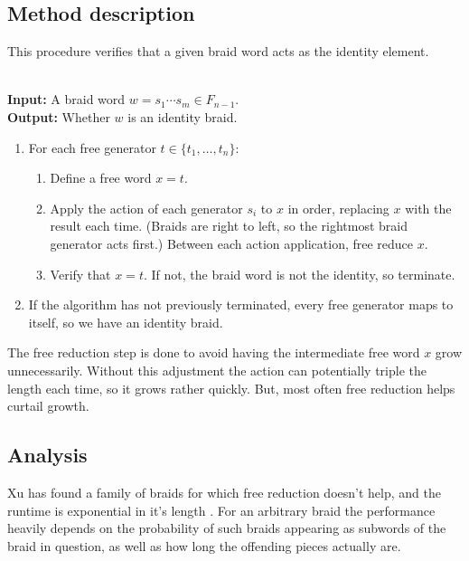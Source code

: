 \documentclass[12pt]{thesis}
\begin{document}
\subsection{Method description}

This procedure verifies that a given braid word
acts as the identity element.
\begin{algorithm}
    ~\\
    \textbf{Input:}  A braid word $w = s_{1} \cdots s_{m} \in F_{n-1}$. 
    ~\\
    \textbf{Output:}  Whether $w$ is an identity braid.
\begin{enumerate}
    \item For each free generator $t \in \{ t_{1} , \ldots , t_{n} \}$:

    \begin{enumerate}
        \item Define a free word $x = t$.

        \item Apply the action of each generator $s_{i}$ to $x$ in order, replacing $x$ with the result each time.
              (Braids are right to left, so the rightmost braid generator acts first.)
              Between each action application, free reduce $x$.

        \item Verify that $x = t$.
              If not, the braid word is not the identity,
              so terminate.
    \end{enumerate}

    \item If the algorithm has not previously terminated,
           every free generator maps to itself,
           so we have an identity braid.
\end{enumerate}

\end{algorithm}

The free reduction step is done to avoid having the intermediate
free word $x$ grow unnecessarily. Without this adjustment
the action can potentially triple the length each time, so it grows rather quickly.
But, most often free reduction helps curtail growth.

\subsection{Analysis}

Xu has found a family of braids for which
free reduction doesn't help, and the runtime is exponential in it's length \cite{word-problem-haskell}.
For an arbitrary braid the performance heavily depends on the probability
of such braids appearing as subwords of the braid in question,
as well as how long the offending pieces actually are.
\end{document}
